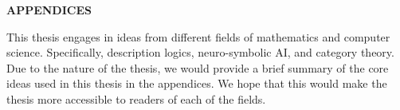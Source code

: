 
\appendix
		\newpage
		\begingroup
			\let\clearpage\relax
			\begin{center}
			\vspace*{2\baselineskip}
			{ \textbf{{\large APPENDICES}}} 
			\end{center}
			This thesis engages in ideas from different fields of mathematics and
			computer science. Specifically,
			description logics, neuro-symbolic AI, and category theory.
			Due to the nature of the thesis, we would provide a brief
			summary of the core ideas used in this thesis in the appendices.
			We hope that this would make the thesis more accessible to readers
			of each of the fields.
            
            
            
    \endgroup

